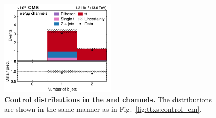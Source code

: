 \begin{figure}[!hp]
\hfill
\includegraphics[width=0.49\textwidth]{figures/ttxs/nbtag_eemm.pdf}
\caption{
    \textbf{Control distributions in the \ee and \mumu channels.} The distributions are shown in the same manner as in Fig.~\ref{fig:ttxs:control_em}.
}
\label{fig:ttxs:control_eemm}
\end{figure}

